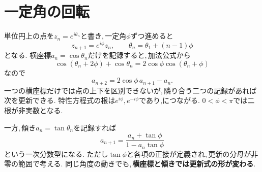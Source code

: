 \section{一定角の回転}\label{節：一定角の回転}

単位円上の点を$z_n=e^{i\theta_n}$と書き,\,一定角$\phi$ずつ進めると
\[
 z_{n+1}=e^{i\phi}z_n,\qquad
 \theta_n=\theta_1+(n-1)\phi
\]
となる.
横座標$a_n=\cos\theta_n$だけを記録すると,\,加法公式から
\[
 \cos(\theta_n+2\phi)+\cos\theta_n
 =2\cos\phi\cos(\theta_n+\phi)
\]
なので
\[
 a_{n+2}=2\cos\phi\,a_{n+1}-a_n.
\]
一つの横座標だけでは点の上下を区別できないが,\,隣り合う二つの記録があれば次を更新できる.
特性方程式の根は$e^{i\phi},e^{-i\phi}$であり,につながる.
$0<\phi<\pi$では二根が非実数となる.

一方,\,傾き$a_n=\tan\theta_n$を記録すれば
\[
 a_{n+1}=\frac{a_n+\tan\phi}{1-a_n\tan\phi}
\]
という一次分数型になる.
ただし$\tan\phi$と各項の正接が定義され,\,更新の分母が非零の範囲で考える.
同じ角度の動きでも,\,\textbf{横座標と傾きでは更新式の形が変わる}.
